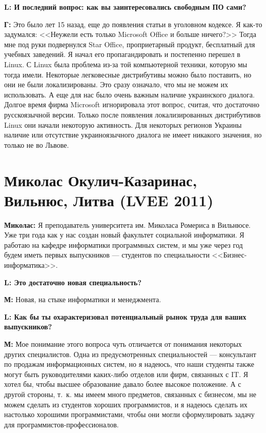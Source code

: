 \documentclass[10pt, a5paper]{article}
\begin{document}
{\noindent \bf L: И последний вопрос: как вы заинтересовались свободным ПО сами?}

{\noindent \bf Г:} Это было лет 15 назад, еще до появления статьи в уголовном кодексе. Я как-то задумался: <<Неужели есть только Microsoft Office и больше ничего?>> Тогда мне под руки подвернулся Star Office, проприетарный продукт, бесплатный для учебных заведений. Я начал его пропагандировать и постепенно перешел в Linux. С Linux была проблема из-за той компьютерной техники, которую мы тогда имели. Некоторые легковесные дистрибутивы можно было поставить, но они не были локализированы. Это сразу означало, что мы не можем их использовать. А еще для нас было очень важным наличие украинского диалога. Долгое время фирма Microsoft игнорировала этот вопрос, считая, что достаточно русскоязычной версии. Только после появления локализированных дистрибутивов Linux они начали некоторую активность. Для некоторых регионов Украины наличие или отсутствие украиноязычного диалога не имеет никакого значения, но только не во Львове.

\section{Миколас Окулич-Казаринас, Вильнюс, Литва (LVEE 2011)}


{\noindent \bf Миколас:} Я преподаватель университета им. Миколаса Ромериса в Вильнюсе. Уже три года как у нас создан новый факультет социальной информатики. Я работаю на кафедре информатики программных систем, и мы уже через год будем иметь первых выпускников --- студентов по специальности <<Бизнес-информатика>>.

{\noindent \bf L: Это достаточно новая специальность?}

{\noindent \bf М:} Новая, на стыке информатики и менеджмента. 

{\noindent \bf L: Как бы ты охарактеризовал потенциальный рынок труда для ваших выпускников?}

{\noindent \bf М:} Мое понимание этого вопроса чуть отличается от понимания некоторых других специалистов. Одна из предусмотренных специальностей --- консультант по продажам информационных систем, но я надеюсь, что наши студенты также могут быть руководителями каких-либо отделов или фирм, связанных с IT. Я хотел бы, чтобы высшее образование давало более высокое положение. А с другой стороны, т.~к. мы имеем много предметов, связанных с бизнесом, мы не можем сделать из студентов хороших программистов, и я надеюсь сделать их настолько хорошими программистами, чтобы они могли сформулировать задачу для программистов-профессионалов.
\end{document}
